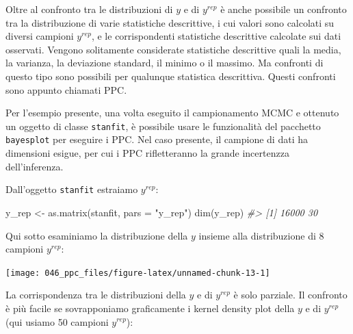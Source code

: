 \documentclass[
  11pt,
  italian,
  a4paper,
  extrafontsizes,onecolumn,openright
  ]{memoir}
\newenvironment{Shaded}{\begin{snugshade}}{\end{snugshade}}
\newcommand{\AttributeTok}[1]{\textcolor[rgb]{0.77,0.63,0.00}{#1}}
\newcommand{\CommentTok}[1]{\textcolor[rgb]{0.56,0.35,0.01}{\textit{#1}}}
\newcommand{\DecValTok}[1]{\textcolor[rgb]{0.00,0.00,0.81}{#1}}
\newcommand{\FunctionTok}[1]{\textcolor[rgb]{0.00,0.00,0.00}{#1}}
\newcommand{\NormalTok}[1]{#1}
\newcommand{\OtherTok}[1]{\textcolor[rgb]{0.56,0.35,0.01}{#1}}
\newcommand{\SpecialCharTok}[1]{\textcolor[rgb]{0.00,0.00,0.00}{#1}}
\newcommand{\StringTok}[1]{\textcolor[rgb]{0.31,0.60,0.02}{#1}}
\theoremstyle{definition}
\theoremstyle{definition}
\theoremstyle{definition}
\theoremstyle{definition}
\theoremstyle{remark}
\begin{document}
Oltre al confronto tra le distribuzioni di \(y\) e di \(y^{rep}\) è anche possibile un confronto tra la distribuzione di varie statistiche descrittive, i cui valori sono calcolati su diversi campioni \(y^{rep}\), e le corrispondenti statistiche descrittive calcolate sui dati osservati. Vengono solitamente considerate statistiche descrittive quali la media, la varianza, la deviazione standard, il minimo o il massimo. Ma confronti di questo tipo sono possibili per qualunque statistica descrittiva. Questi confronti sono appunto chiamati PPC.

Per l'esempio presente, una volta eseguito il campionamento MCMC e ottenuto un oggetto di classe \texttt{stanfit}, è possibile usare le funzionalità del pacchetto \texttt{bayesplot} per eseguire i PPC. Nel caso presente, il campione di dati ha dimensioni esigue, per cui i PPC rifletteranno la grande incertenzza dell'inferenza.

Dall'oggetto \texttt{stanfit} estraiamo \(y^{rep}\):

\begin{Shaded}
\begin{Highlighting}[]
\NormalTok{y\_rep }\OtherTok{\textless{}{-}} \FunctionTok{as.matrix}\NormalTok{(stanfit, }\AttributeTok{pars =} \StringTok{"y\_rep"}\NormalTok{)}
\FunctionTok{dim}\NormalTok{(y\_rep)}
\CommentTok{\#\textgreater{} [1] 16000    30}
\end{Highlighting}
\end{Shaded}

\noindent
Qui sotto esaminiamo la distribuzione della \(y\) insieme alla distribuzione di 8 campioni \(y^{rep}\):

\begin{Shaded}
\end{Shaded}

\begin{center}\texttt{[image: 046\_ppc\_files/figure-latex/unnamed-chunk-13-1]} \end{center}

La corrispondenza tra le distribuzioni della \(y\) e di \(y^{rep}\) è solo parziale. Il confronto è più facile se sovrapponiamo graficamente i kernel density plot della \(y\) e di \(y^{rep}\) (qui usiamo 50 campioni \(y^{rep}\)):
\end{document}
